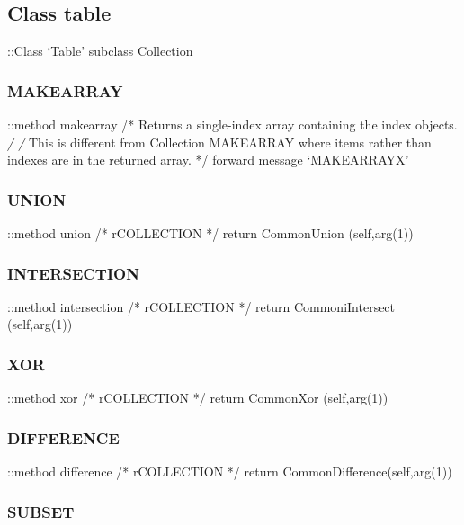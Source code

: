 \hypertarget{class-table}{%
\subsection{Class table}\label{class-table}}

::Class `Table' subclass Collection

\hypertarget{makearray}{%
\subsubsection{MAKEARRAY}\label{makearray}}

::method makearray /* Returns a single-index array containing the index
objects. \emph{/ /} This is different from Collection MAKEARRAY where
items rather than indexes are in the returned array. */ forward message
`MAKEARRAYX'

\hypertarget{union}{%
\subsubsection{UNION}\label{union}}

::method union /* rCOLLECTION */ return CommonUnion (self,arg(1))

\hypertarget{intersection}{%
\subsubsection{INTERSECTION}\label{intersection}}

::method intersection /* rCOLLECTION */ return CommoniIntersect
(self,arg(1))

\hypertarget{xor}{%
\subsubsection{XOR}\label{xor}}

::method xor /* rCOLLECTION */ return CommonXor (self,arg(1))

\hypertarget{difference}{%
\subsubsection{DIFFERENCE}\label{difference}}

::method difference /* rCOLLECTION */ return
CommonDifference(self,arg(1))

\hypertarget{subset}{%
\subsubsection{SUBSET}\label{subset}}

